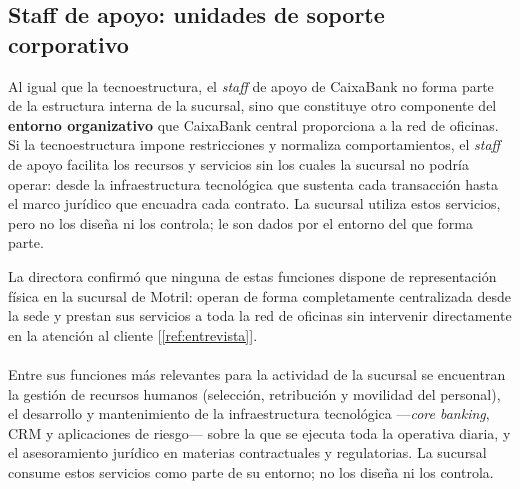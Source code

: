 \subsection{Staff de apoyo: unidades de soporte corporativo}

Al igual que la tecnoestructura, el \textit{staff} de apoyo de CaixaBank no forma parte
de la estructura interna de la sucursal, sino que constituye otro componente del
\textbf{entorno organizativo} que CaixaBank central proporciona a la red de oficinas.
Si la tecnoestructura impone restricciones y normaliza comportamientos, el
\textit{staff} de apoyo facilita los recursos y servicios sin los cuales la sucursal no
podría operar: desde la infraestructura tecnológica que sustenta cada transacción hasta
el marco jurídico que encuadra cada contrato. La sucursal utiliza estos servicios, pero
no los diseña ni los controla; le son dados por el entorno del que forma parte.

La directora confirmó que ninguna de estas funciones dispone de representación física en
la sucursal de Motril: operan de forma completamente centralizada desde la sede y prestan
sus servicios a toda la red de oficinas sin intervenir directamente en la atención al
cliente [\ref{ref:entrevista}].
~\\~\\
Entre sus funciones más relevantes para la actividad de la sucursal se encuentran la
gestión de recursos humanos (selección, retribución y movilidad del personal), el
desarrollo y mantenimiento de la infraestructura tecnológica ---\textit{core banking},
CRM y aplicaciones de riesgo--- sobre la que se ejecuta toda la operativa diaria, y el
asesoramiento jurídico en materias contractuales y regulatorias. La sucursal consume
estos servicios como parte de su entorno; no los diseña ni los controla.

\endinput
